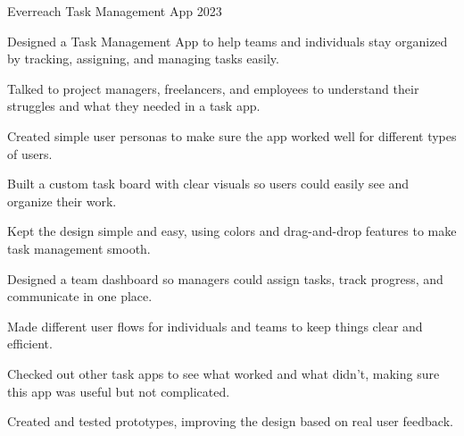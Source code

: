 

\begin{cvprojects}

\cvproject
  {Everreach Task Management App}
  {2023}
  {
    \begin{cvitems} %
      \item {Designed a Task Management App to help teams and individuals stay organized by tracking, assigning, and managing tasks easily.}
      \item {Talked to project managers, freelancers, and employees to understand their struggles and what they needed in a task app.}
      \item {Created simple user personas to make sure the app worked well for different types of users.}
      \item {Built a custom task board with clear visuals so users could easily see and organize their work.}
      \item {Kept the design simple and easy, using colors and drag-and-drop features to make task management smooth.}
      \item {Designed a team dashboard so managers could assign tasks, track progress, and communicate in one place.}
      \item {Made different user flows for individuals and teams to keep things clear and efficient.}
      \item {Checked out other task apps to see what worked and what didn’t, making sure this app was useful but not complicated.}
      \item {Created and tested prototypes, improving the design based on real user feedback.}
    \end{cvitems}
  }%


\end{cvprojects}
